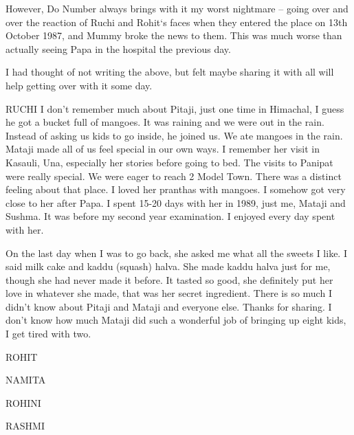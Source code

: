 However, Do Number always brings with it my worst nightmare – going over and over the reaction of Ruchi and Rohit‘s faces when they entered the place on 13th October 1987, and Mummy broke the news to them. This was much worse than actually seeing Papa in the hospital the previous day. 

I had thought of not writing the above, but felt maybe sharing it with all will help getting over with it some day. 






RUCHI
I don’t remember much about Pitaji, just one time in Himachal, I guess he got a bucket full of mangoes. It was raining and we were out in the rain. Instead of asking us kids to go inside, he joined us. We ate mangoes in the rain. Mataji made all of us feel special in our own ways. I remember her visit in Kasauli, Una, especially her stories before going to bed. 
The visits to Panipat were really special. We were eager to reach 2 Model Town. There was a distinct feeling about that place. I loved her pranthas with mangoes. I somehow got very close to her after Papa. I spent 15-20 days with her in 1989, just me, Mataji and Sushma. It was before my second year examination. I enjoyed every day spent with her. 

On the last day when I was to go back, she asked me what all the sweets I like. I said milk cake and kaddu (squash) halva. She made kaddu halva just for me, though she had never made it before. It tasted so good, she definitely put her love in whatever she made, that was her secret ingredient. There is so much I didn’t know about Pitaji and Mataji and everyone else. Thanks for sharing. 
I don’t know how much Mataji did such a wonderful job of bringing up eight kids, I get tired with two.

ROHIT

NAMITA

ROHINI

RASHMI


